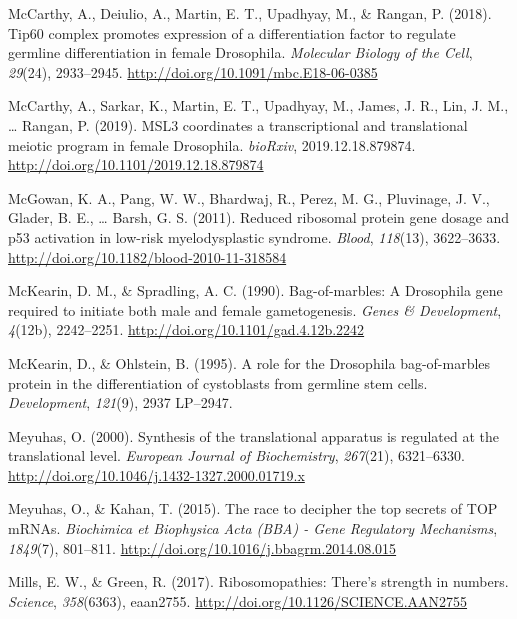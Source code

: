 \documentclass[12pt,oneside]{reedthesis}
\newlength{\cslhangindent}
\newenvironment{cslreferences}%
  {\setlength{\parindent}{0pt}%
  \everypar{\setlength{\hangindent}{\cslhangindent}}\ignorespaces}%
  {\par}
\begin{document}
\begin{cslreferences}
\leavevmode\hypertarget{ref-McCarthy2018h}{}%
McCarthy, A., Deiulio, A., Martin, E. T., Upadhyay, M., \& Rangan, P. (2018). Tip60 complex promotes expression of a differentiation factor to regulate germline differentiation in female Drosophila. \emph{Molecular Biology of the Cell}, \emph{29}(24), 2933--2945. \url{http://doi.org/10.1091/mbc.E18-06-0385}

\leavevmode\hypertarget{ref-mccarthyMSL3CoordinatesTranscriptional2019}{}%
McCarthy, A., Sarkar, K., Martin, E. T., Upadhyay, M., James, J. R., Lin, J. M., \ldots{} Rangan, P. (2019). MSL3 coordinates a transcriptional and translational meiotic program in female Drosophila. \emph{bioRxiv}, 2019.12.18.879874. \url{http://doi.org/10.1101/2019.12.18.879874}

\leavevmode\hypertarget{ref-mcgowanReducedRibosomalProtein2011}{}%
McGowan, K. A., Pang, W. W., Bhardwaj, R., Perez, M. G., Pluvinage, J. V., Glader, B. E., \ldots{} Barsh, G. S. (2011). Reduced ribosomal protein gene dosage and p53 activation in low-risk myelodysplastic syndrome. \emph{Blood}, \emph{118}(13), 3622--3633. \url{http://doi.org/10.1182/blood-2010-11-318584}

\leavevmode\hypertarget{ref-McKearin1990e}{}%
McKearin, D. M., \& Spradling, A. C. (1990). Bag-of-marbles: A Drosophila gene required to initiate both male and female gametogenesis. \emph{Genes \& Development}, \emph{4}(12b), 2242--2251. \url{http://doi.org/10.1101/gad.4.12b.2242}

\leavevmode\hypertarget{ref-McKearin1995b}{}%
McKearin, D., \& Ohlstein, B. (1995). A role for the Drosophila bag-of-marbles protein in the differentiation of cystoblasts from germline stem cells. \emph{Development}, \emph{121}(9), 2937 LP--2947.

\leavevmode\hypertarget{ref-meyuhasSynthesisTranslationalApparatus2000}{}%
Meyuhas, O. (2000). Synthesis of the translational apparatus is regulated at the translational level. \emph{European Journal of Biochemistry}, \emph{267}(21), 6321--6330. \url{http://doi.org/10.1046/j.1432-1327.2000.01719.x}

\leavevmode\hypertarget{ref-meyuhasRaceDecipherTop2015}{}%
Meyuhas, O., \& Kahan, T. (2015). The race to decipher the top secrets of TOP mRNAs. \emph{Biochimica et Biophysica Acta (BBA) - Gene Regulatory Mechanisms}, \emph{1849}(7), 801--811. \url{http://doi.org/10.1016/j.bbagrm.2014.08.015}

\leavevmode\hypertarget{ref-Mills2017c}{}%
Mills, E. W., \& Green, R. (2017). Ribosomopathies: There's strength in numbers. \emph{Science}, \emph{358}(6363), eaan2755. \url{http://doi.org/10.1126/SCIENCE.AAN2755}


\end{cslreferences}
\end{document}
